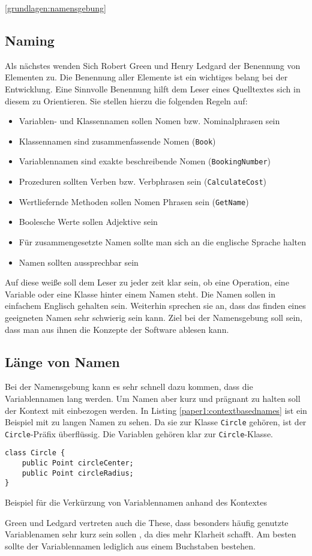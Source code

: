 \ref{grundlagen:namensgebung}

\subsection{Naming}
Als nächstes wenden Sich Robert Green und Henry Ledgard der Benennung von Elementen zu\cite[S. 3f.]{Green}. Die Benennung aller Elemente ist ein wichtiges belang bei der Entwicklung. Eine Sinnvolle Benennung hilft dem Leser eines Quelltextes sich in diesem zu Orientieren. Sie stellen hierzu die folgenden Regeln auf\cite[S. 4]{Green}:
\begin{itemize}
    \item Variablen- und Klassennamen sollen Nomen bzw. Nominalphrasen sein
    \item Klassennamen sind zusammenfassende Nomen (\texttt{Book})
    \item Variablennamen sind exakte beschreibende Nomen (\texttt{BookingNumber})
    \item Prozeduren sollten Verben bzw. Verbphrasen sein (\texttt{CalculateCost})
    \item Wertliefernde Methoden sollen Nomen Phrasen sein (\texttt{GetName})
    \item Boolesche Werte sollen Adjektive sein
    \item Für zusammengesetzte Namen sollte man sich an die englische Sprache halten
    \item Namen sollten aussprechbar sein
\end{itemize}

Auf diese weiße soll dem Leser zu jeder zeit klar sein, ob eine Operation, eine Variable oder eine Klasse hinter einem Namen steht. Die Namen sollen in einfachem Englisch gehalten sein.
Weiterhin sprechen sie an, dass das finden eines geeigneten Namen sehr schwierig sein kann. Ziel bei der Namensgebung soll sein, dass man aus ihnen die Konzepte der Software ablesen kann.

\subsection{Länge von Namen}
Bei der Namensgebung kann es sehr schnell dazu kommen, dass die Variablennamen lang werden. Um Namen aber kurz und prägnant zu halten soll der Kontext mit einbezogen werden. In Listing \ref{paper1:contextbasednames} ist ein Beispiel mit zu langen Namen zu sehen. Da sie zur Klasse \texttt{Circle} gehören, ist der \texttt{Circle}-Präfix überflüssig. Die Variablen gehören klar zur \texttt{Circle}-Klasse.
\cite[S. 4f.]{Green}
\begin{listing}[H]
    \begin{verbatim}
class Circle {
    public Point circleCenter;
    public Point circleRadius;
}
    \end{verbatim}
    \caption{Beispiel für die Verkürzung von Variablennamen anhand des Kontextes}
    \label{paper1:contextbasednames}
\end{listing}
Green und Ledgard vertreten auch die These, dass besonders häufig genutzte Variablenamen sehr kurz sein sollen \cite[S. 6]{Green}, da dies mehr Klarheit schafft. Am besten sollte der Variablennamen lediglich aus einem Buchstaben bestehen.

